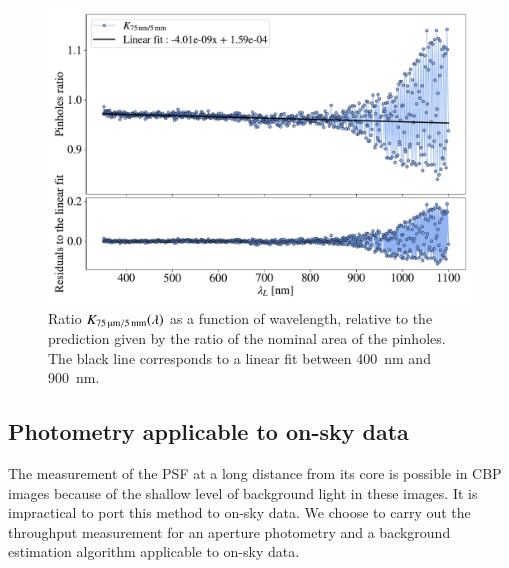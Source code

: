 \begin{figure}%
    \centering
    \includegraphics[width=\columnwidth]{fig/ratio_pinholes.pdf}
    \caption{Ratio $K_\mathrm{\SI{75}{\micro\meter}/\SI{5}{\milli\meter}}(\lambda)$ as a function of wavelength, relative to the prediction given by the ratio of the nominal area of the pinholes. The black line corresponds to a linear fit between \SI{400}{\nm} and \SI{900}{\nm}.}
    \label{fig:ratio_pinholes}
\end{figure}


\subsection{Photometry applicable to on-sky data}
\label{sec:photometry_small}

The measurement of the PSF at a long distance from its core is possible in CBP images because of the shallow level of background light in these images. It is impractical to port this method to on-sky data. We choose to carry out the throughput measurement for an aperture photometry and a background estimation algorithm applicable to on-sky data. 

